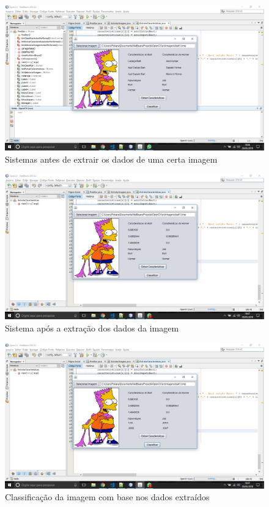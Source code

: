 \documentclass[12pt]{article}
\begin{document}




\newpage
\begin{figure}[ht]
\centering
\includegraphics[width=.9\textwidth]{pre-extracao.jpeg}
\caption{Sistemas antes de extrair os dados de uma certa imagem}
\label{fig:exampleFig1}
\end{figure}

\begin{figure}[htt]
\centering
\includegraphics[width=.9\textwidth]{apos-extrair.jpeg}
\caption{Sistema após a extração dos dados da imagem}
\label{fig:exampleFig2}
\end{figure}

\begin{figure}[htt]
\centering
\includegraphics[width=.9\textwidth]{classificacao.jpeg}
\caption{Classificação da imagem com base nos dados extraídos}
\label{fig:exampleFig2}
\end{figure}
\end{document}
